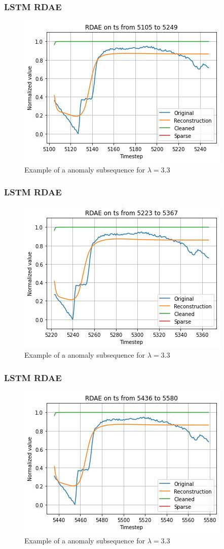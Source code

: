 \documentclass{beamer}
\theoremstyle{plain}
\theoremstyle{definition}
\theoremstyle{remark}
\begin{document}
\begin{frame}
	\frametitle{LSTM RDAE}
	\begin{figure}
		\centering
		\includegraphics[width=0.7\linewidth]{Images/LSTMlam3.3ts_anomalyzoom5105.jpg}
		\caption[]{Example of a anomaly subsequence for $\lambda=3.3$}
	\end{figure}
\end{frame}

\begin{frame}
	\frametitle{LSTM RDAE}
	\begin{figure}
		\centering
		\includegraphics[width=0.7\linewidth]{Images/LSTMlam3.3ts_anomalyzoom5223.jpg}
		\caption[]{Example of a anomaly subsequence for $\lambda=3.3$}
	\end{figure}
\end{frame}

\begin{frame}
	\frametitle{LSTM RDAE}
	\begin{figure}
		\centering
		\includegraphics[width=0.7\linewidth]{Images/LSTMlam3.3ts_anomalyzoom5436.jpg}
		\caption[]{Example of a anomaly subsequence for $\lambda=3.3$}
	\end{figure}
\end{frame}
\end{document}
